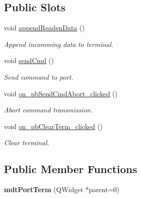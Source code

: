 \subsection*{Public Slots}
\begin{DoxyCompactItemize}
\item 
void \hyperlink{classmdt_port_term_a5bd2b5e6c19c2c4b612f84763bb9ed6f}{appendReadenData} ()
\begin{DoxyCompactList}\small\item\em Append incomming data to terminal. \end{DoxyCompactList}\item 
\hypertarget{classmdt_port_term_a7ec568c44f862fe7aee83f1a271ac6bb}{
void \hyperlink{classmdt_port_term_a7ec568c44f862fe7aee83f1a271ac6bb}{sendCmd} ()}
\label{classmdt_port_term_a7ec568c44f862fe7aee83f1a271ac6bb}

\begin{DoxyCompactList}\small\item\em Send command to port. \end{DoxyCompactList}\item 
\hypertarget{classmdt_port_term_a1b232e686b401d7103eb1c682be330a9}{
void \hyperlink{classmdt_port_term_a1b232e686b401d7103eb1c682be330a9}{on\_\-pbSendCmdAbort\_\-clicked} ()}
\label{classmdt_port_term_a1b232e686b401d7103eb1c682be330a9}

\begin{DoxyCompactList}\small\item\em Abort command transmission. \end{DoxyCompactList}\item 
\hypertarget{classmdt_port_term_abb3fc55837782dbea240b069a48b18ce}{
void \hyperlink{classmdt_port_term_abb3fc55837782dbea240b069a48b18ce}{on\_\-pbClearTerm\_\-clicked} ()}
\label{classmdt_port_term_abb3fc55837782dbea240b069a48b18ce}

\begin{DoxyCompactList}\small\item\em Clear terminal. \end{DoxyCompactList}\end{DoxyCompactItemize}
\subsection*{Public Member Functions}
\begin{DoxyCompactItemize}
\item 
\hypertarget{classmdt_port_term_a5e93890f53b5112be80983779a3ab233}{
{\bfseries mdtPortTerm} (QWidget $\ast$parent=0)}
\label{classmdt_port_term_a5e93890f53b5112be80983779a3ab233}

\end{DoxyCompactItemize}


